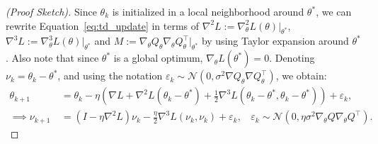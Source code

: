 \begin{proof}[(Proof Sketch)]
Since $\theta_k$ is initialized in a local neighborhood around $\theta^*$, we can rewrite Equation~\ref{eq:td_update} in terms of $\nabla^2 L := \nabla^2_\theta L(\theta)|_{\theta^*}$, $\nabla^3 L := \nabla^3_\theta L(\theta)|_{\theta^*}$ and $M := \nabla_\theta Q_\theta \nabla_\theta Q_\theta^\top|_{\theta^*}$ by using Taylor expansion around $\theta^*$. Also note that since $\theta^*$ is a global optimum, $\nabla_\theta L(\theta^*) = 0$. Denoting $\nu_k = \theta_k - \theta^*$, and using the notation $\varepsilon_k \sim \mathcal{N}(0, \sigma^2 \nabla Q_\theta \nabla Q_\theta^\top)$, we obtain:
\begin{align}
    \label{eqn:\nu_k}
    \theta_{k+1} ~&= \theta_k - \eta \left( \nabla L + \nabla^2 L (\theta_k - \theta^*) + \frac{1}{2} \nabla^3 L (\theta_k - \theta^*, \theta_k - \theta^*) \right) + \varepsilon_k, ~~~~~~\\
    \label{eqn:recursive_v}
    \implies \nu_{k+1} ~&= (I - \eta \nabla^2 L )\nu_k  - \frac{\eta}{2} \nabla^3 L (\nu_k, \nu_k) + \varepsilon_k, ~~~~ \varepsilon_k \sim \mathcal{N}(0, \eta \sigma^2 \nabla_\theta Q \nabla_\theta Q^\top).

\end{align}
\end{proof}
